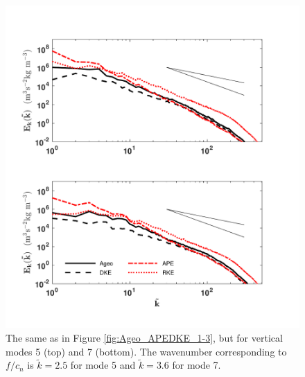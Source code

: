 \begin{figure}[H]
\includegraphics[scale=1]{Chapter4/img/Ageo_APEDKE_5-7}
\caption{The same as in Figure \ref{fig:Ageo_APEDKE_1-3}, but for vertical modes 5 (top) and 7 (bottom). The wavenumber corresponding to $f/c_n$ is  $\tilde{k} = 2.5$ for mode 5 and $\tilde{k} = 3.6$ for mode 7.}
\label{fig:Ageo_APEDKE_5-7}
\end{figure}


